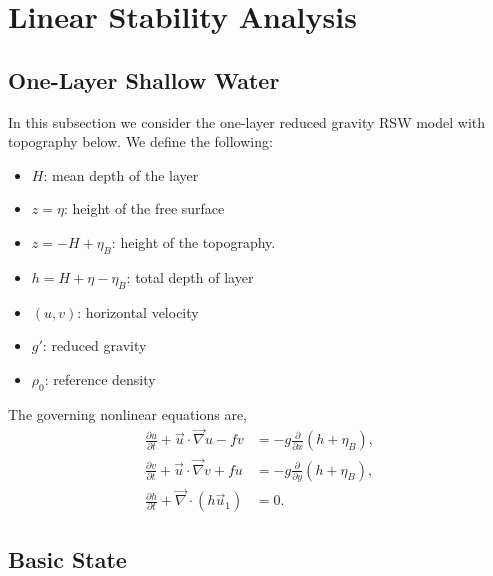 \documentclass[11pt]{article}
\begin{document}

 



\section*{Linear Stability Analysis}

\subsection*{One-Layer Shallow Water}

In this subsection we consider the one-layer reduced gravity RSW model with topography below.  
We define the following:
\begin{itemize}
\item $H$: mean depth of the layer
\item $z=\eta$: height of the free surface
\item $z=-H + \eta_B$: height of the topography.
\item $h = H + \eta - \eta_B$: total depth of layer
\item $(u,v)$: horizontal velocity
\item $g'$: reduced gravity
\item $\rho_0$: reference density
\end{itemize}
The governing nonlinear equations are,
\begin{align*}
\frac{\partial u}{\partial t} + {\vec u} \cdot \vec \nabla u - f v & 
= - g \frac{\partial}{\partial x} \left( h + \eta_B \right) , \\
 \frac{\partial v}{\partial t} + {\vec u} \cdot \vec \nabla v + f u & 
= - g \frac{\partial}{\partial y} \left( h + \eta_B \right) , \\
\frac{\partial h}{\partial t} + \vec\nabla \cdot \left( h \vec u_1 \right) & = 0.
\end{align*}

\subsection*{Basic State}
\end{document}
